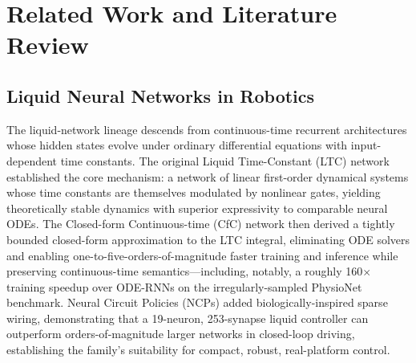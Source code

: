 \documentclass[conference]{IEEEtran}
\begin{document}
\section{Related Work and Literature Review}
\label{sec:related}

\subsection{Liquid Neural Networks in Robotics}
The liquid-network lineage descends from continuous-time recurrent architectures whose hidden states evolve under ordinary differential equations with input-dependent time constants. The original Liquid Time-Constant (LTC) network \cite{hasani2021ltc} established the core mechanism: a network of linear first-order dynamical systems whose time constants are themselves modulated by nonlinear gates, yielding theoretically stable dynamics with superior expressivity to comparable neural ODEs. The Closed-form Continuous-time (CfC) network \cite{hasani2022cfc} then derived a tightly bounded closed-form approximation to the LTC integral, eliminating ODE solvers and enabling one-to-five-orders-of-magnitude faster training and inference while preserving continuous-time semantics---including, notably, a roughly 160$\times$ training speedup over ODE-RNNs on the irregularly-sampled PhysioNet benchmark. Neural Circuit Policies (NCPs) \cite{lechner2020ncp} added biologically-inspired sparse wiring, demonstrating that a 19-neuron, 253-synapse liquid controller can outperform orders-of-magnitude larger networks in closed-loop driving, establishing the family's suitability for compact, robust, real-platform control.
\end{document}

